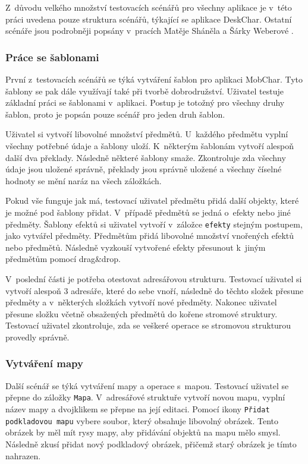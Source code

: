 \documentclass[thesis=B,czech]{resources/FITthesis}[2012/06/26]
\begin{document}
Z~důvodu velkého množství testovacích scénářů pro všechny aplikace je v~této práci uvedena pouze struktura scénářů, týkající se aplikace DeskChar. Ostatní scénáře jsou podrobněji popsány v~pracích Matěje Sháněla \cite{Shanel_2017} a Šárky Weberové \cite{Weberova_2017}. 

\subsubsection{Práce se šablonami}
První z~testovacích scénářů se týká vytváření šablon pro aplikaci MobChar. Tyto šablony se pak dále využívají také při tvorbě dobrodružství. Uživatel testuje základní práci se šablonami v~aplikaci. Postup je totožný pro všechny druhy šablon, proto je popsán pouze scénář pro jeden druh šablon. \par

Uživatel si vytvoří libovolné množství předmětů. U~každého předmětu vyplní všechny potřebné údaje a šablony uloží. K~některým šablonám vytvoří alespoň další dva překlady. Následně některé šablony smaže. Zkontroluje zda všechny údaje jsou uložené správně, překlady jsou správně uložené a všechny číselné hodnoty se mění naráz na všech záložkách. \par

Pokud vše funguje jak má, testovací uživatel předmětu přidá další objekty, které je možné pod šablony přidat. V~případě předmětů se jedná o~efekty nebo jiné předměty. Šablony efektů si uživatel vytvoří v~záložce \texttt{efekty} stejným postupem, jako vytvářel předměty. Předmětům přidá libovolné množství vnořených efektů nebo předmětů. Následně vyzkouší vytvořené efekty přesunout k~jiným předmětům pomocí drag\&drop. \par 

V~poslední části je potřeba otestovat adresářovou strukturu. Testovací uživatel si vytvoří alespoň 3 adresáře, které do sebe vnoří, následně do těchto složek přesune předměty a v~některých složkách vytvoří nové předměty. Nakonec uživatel přesune složku včetně obsažených předmětů do kořene stromové struktury. Testovací uživatel zkontroluje, zda se veškeré operace se stromovou strukturou provedly správně. 

\subsubsection{Vytváření mapy}
Další scénář se týká vytváření mapy a operace s~mapou.  Testovací uživatel se přepne do záložky \texttt{Mapa}. V~adresářové struktuře vytvoří novou mapu, vyplní název mapy a dvojklikem se přepne na její editaci. Pomocí ikony \texttt{Přidat podkladovou mapu} vybere soubor, který obsahuje libovolný obrázek. Tento obrázek by měl mít rysy mapy, aby přidávání objektů na mapu mělo smysl. Následně zkusí přidat nový podkladový obrázek, přičemž starý obrázek je tímto nahrazen. \par
\end{document}
